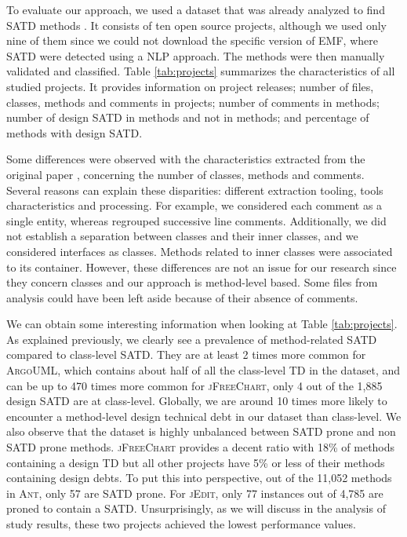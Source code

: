 To evaluate our approach, we used a dataset that was already analyzed to find \ac{SATD} methods \citep{maldonado17}. It consists of ten open source projects, although we used only nine of them since we could not download the specific version of EMF, where \ac{SATD} were detected using a \ac{NLP} approach. The methods were then manually validated and classified. Table \ref{tab:projects} summarizes the characteristics of all studied projects. It provides information on project releases; number of files, classes, methods and comments in projects; number of comments in methods; number of design \ac{SATD} in methods and not in methods; and percentage of methods with design \ac{SATD}. \par

Some differences were observed with the characteristics extracted from the original paper \citep{maldonado17}, concerning the number of classes, methods and comments. Several reasons can explain these disparities: different extraction tooling, tools characteristics and processing. For example, we considered each comment as a single entity, whereas \citet{maldonado17} regrouped successive line comments. Additionally, we did not establish a separation between classes and their inner classes, and we considered interfaces as classes. Methods related to inner classes were associated to its container. However, these differences are not an issue for our research since they concern classes and our approach is method-level based. Some files from \citet{maldonado17} analysis could have been left aside because of their absence of comments. \par 

We can obtain some interesting information when looking at Table \ref{tab:projects}. As explained previously, we clearly see a prevalence of method-related \ac{SATD} compared to class-level \ac{SATD}. They are at least 2 times more common for \textsc{ArgoUML}, which contains about half of all the class-level \ac{TD} in the dataset, and can be up to 470 times more common for \textsc{jFreeChart}, only 4 out of the 1,885 design \ac{SATD} are at class-level. Globally, we are around 10 times more likely to encounter a method-level design technical debt in our dataset than class-level. We also observe that the dataset is highly unbalanced between \ac{SATD} prone and non \ac{SATD} prone methods. \textsc{jFreeChart} provides a decent ratio with 18\% of methods containing a design \ac{TD} but all other projects have 5\% or less of their methods containing design debts. To put this into perspective, out of the 11,052 methods in \textsc{Ant}, only 57 are \ac{SATD} prone. For \textsc{jEdit}, only 77 instances out of 4,785 are proned to contain a \ac{SATD}. Unsurprisingly, as we will discuss in the analysis of study results, these two projects achieved the lowest performance values. \par 

